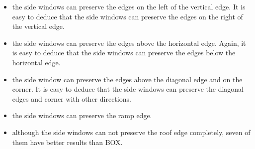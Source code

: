 \documentclass[10pt,twocolumn,letterpaper]{article}
\begin{document}
\begin{itemize}
	\item the  side windows can preserve the edges on the left of the vertical edge. It is easy to deduce that the  side windows can preserve the edges on the right of the vertical edge.
	\item the  side windows can preserve the edges above the horizontal edge. Again, it is easy to deduce that the  side windows can preserve the edges below the horizontal edge.
	\item the  side window can preserve the edges above the diagonal edge and on the corner. It is easy to deduce that the  side windows can preserve the diagonal edges and corner with other directions.
	\item the  side windows can preserve the ramp edge.
	\item although the side windows can not preserve the roof edge completely, seven of them have better results than BOX.
\end{itemize}
\end{document}

